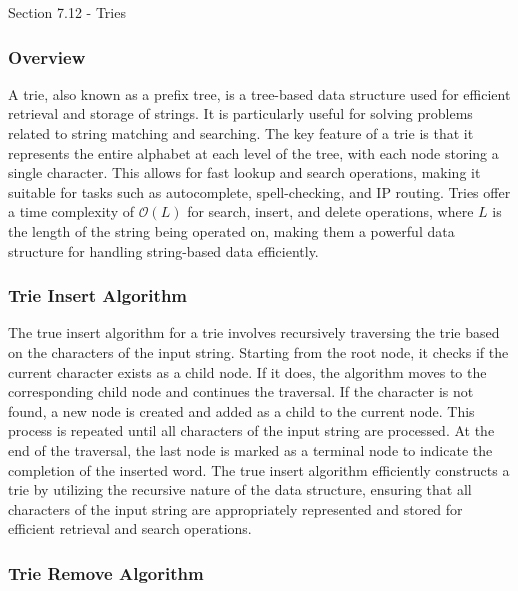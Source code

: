 \begin{notes}{Section 7.12 - Tries}
    \subsubsection*{Overview}

    A trie, also known as a prefix tree, is a tree-based data structure used for efficient retrieval and storage of strings. It is particularly useful for solving problems related to string matching and searching. The key feature of a trie is that it represents the entire alphabet at each level of the tree, with each node storing a single character. 
    This allows for fast lookup and search operations, making it suitable for tasks such as autocomplete, spell-checking, and IP routing. Tries offer a time complexity of $\mathcal{O}(L)$ for search, insert, and delete operations, where $L$ is the length of the string being operated on, making them a powerful data structure for handling string-based data efficiently.
    
    \subsubsection*{Trie Insert Algorithm}
    
    The true insert algorithm for a trie involves recursively traversing the trie based on the characters of the input string. Starting from the root node, it checks if the current character exists as a child node. If it does, the algorithm moves to the corresponding child node and continues the traversal. If the character is not found, a new node 
    is created and added as a child to the current node. This process is repeated until all characters of the input string are processed. At the end of the traversal, the last node is marked as a terminal node to indicate the completion of the inserted word. The true insert algorithm efficiently constructs a trie by utilizing the recursive nature 
    of the data structure, ensuring that all characters of the input string are appropriately represented and stored for efficient retrieval and search operations.
    
    \subsubsection*{Trie Remove Algorithm}
    

\end{notes}
